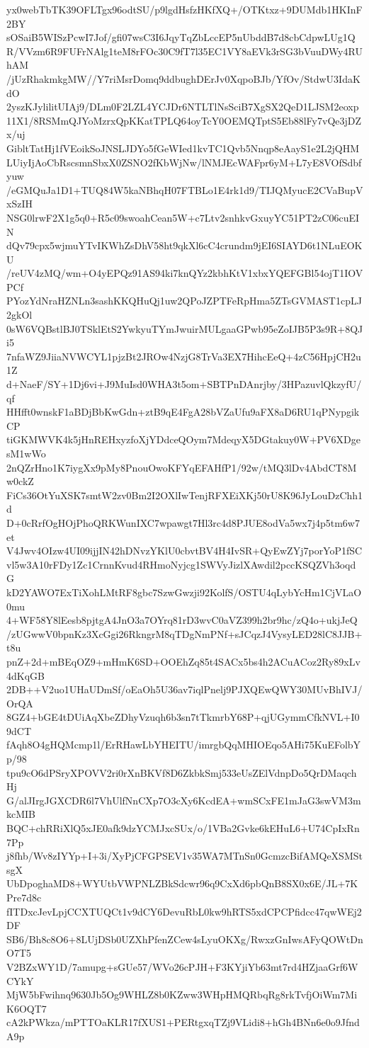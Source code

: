 yx0webTbTK39OFLTgx96odtSU/p9lgdHsfzHKfXQ+/OTKtxz+9DUMdb1HKInF2BY
sOSaiB5WISzPcwI7Jof/gfi07wsC3I6JqyTqZbLccEP5nUbddB7d8cbCdpwLUg1Q
R/VVzm6R9FUFrNAlg1teM8rFOc30C9fT7l35EC1VY8aEVk3rSG3bVuuDWy4RUhAM
/jUzRhakmkgMW//Y7riMsrDomq9ddbughDErJv0XqpoBJb/YfOv/StdwU3IdaKdO
2yszKJylilitUIAj9/DLm0F2LZL4YCJDr6NTLTlNsSciB7XgSX2QeD1LJSM2eoxp
11X1/8RSMmQJYoMzrxQpKKatTPLQ64oyTcY0OEMQTptS5Eb88lFy7vQe3jDZx/uj
GibltTatHj1fVEoikSoJNSLJDYo5fGeWIed1kvTC1Qvb5Nnqp8eAayS1e2L2jQHM
LUiyIjAoCbRscsmnSbxX0ZSNO2fKbWjNw/lNMJEcWAFpr6yM+L7yE8VOfSdbfyuw
/eGMQuJa1D1+TUQ84W5kaNBhqH07FTBLo1E4rk1d9/TIJQMyucE2CVaBupVxSzIH
NSG0lrwF2X1g5q0+R5c09swoahCean5W+c7Ltv2snhkvGxuyYC51PT2zC06cuEIN
dQv79cpx5wjmuYTvIKWhZsDhV58ht9qkXl6cC4crundm9jEI6SIAYD6t1NLuEOKU
/reUV4zMQ/wm+O4yEPQz91AS94ki7knQYz2kbhKtV1xbxYQEFGBl54ojT1IOVPCf
PYozYdNraHZNLn3sashKKQHuQj1uw2QPoJZPTFeRpHma5ZTsGVMAST1cpLJ2gkOl
0sW6VQBstlBJ0TSklEtS2YwkyuTYmJwuirMULgaaGPwb95eZoIJB5P3s9R+8QJi5
7nfaWZ9JiiaNVWCYL1pjzBt2JROw4NzjG8TrVa3EX7HihcEeQ+4zC56HpjCH2u1Z
d+NaeF/SY+1Dj6vi+J9MuIsd0WHA3t5om+SBTPnDAnrjby/3HPazuvlQkzyfU/qf
HHfft0wnskF1aBDjBbKwGdn+ztB9qE4FgA28bVZaUfu9aFX8aD6RU1qPNypgikCP
tiGKMWVK4k5jHnREHxyzfoXjYDdceQOym7MdeqyX5DGtakuy0W+PV6XDgesM1wWo
2nQZrHno1K7iygXx9pMy8PnouOwoKFYqEFAHfP1/92w/tMQ3lDv4AbdCT8Mw0ckZ
FiCs36OtYuXSK7smtW2zv0Bm2I2OXlIwTenjRFXEiXKj50rU8K96JyLouDzChh1d
D+0cRrfOgHOjPhoQRKWunIXC7wpawgt7Hl3rc4d8PJUE8odVa5wx7j4p5tm6w7et
V4Jwv4OIzw4UI09ijjIN42hDNvzYKlU0cbvtBV4H4IvSR+QyEwZYj7porYoP1fSC
vl5w3A10rFDy1Zc1CrnnKvud4RHmoNyjcg1SWVyJizlXAwdil2pccKSQZVh3oqdG
kD2YAWO7ExTiXohLMtRF8gbc7SzwGwzji92KolfS/OSTU4qLybYcHm1CjVLaO0mu
4+WF58Y8lEesb8pjtgA4JnO3a7OYrq81rD3wvC0aVZ399h2br9hc/zQ4o+ukjJeQ
/zUGwwV0bpnKz3XcGgi26RkngrM8qTDgNmPNf+sJCqzJ4VysyLED28lC8JJB+t8u
pnZ+2d+mBEqOZ9+mHmK6SD+OOEhZq85t4SACx5bs4h2ACuACoz2Ry89xLv4dKqGB
2DB++V2uo1UHaUDmSf/oEaOh5U36av7iqlPnelj9PJXQEwQWY30MUvBhIVJ/OrQA
8GZ4+bGE4tDUiAqXbeZDhyVzuqh6b3sn7tTkmrbY68P+qjUGymmCfkNVL+I09dCT
fAqh8O4gHQMcmp1l/ErRHawLbYHEITU/imrgbQqMHIOEqo5AHi75KuEFolbYp/98
tpu9cO6dPSryXPOVV2ri0rXnBKVf8D6ZkbkSmj533eUsZElVdnpDo5QrDMaqchHj
G/alJIrgJGXCDR6l7VhUlfNnCXp7O3cXy6KcdEA+wmSCxFE1mJaG3swVM3mkcMIB
BQC+chRRiXlQ5xJE0afk9dzYCMJxcSUx/o/1VBa2Gvke6kEHuL6+U74CpIxRn7Pp
j8fhb/Wv8zIYYp+I+3i/XyPjCFGPSEV1v35WA7MTnSn0GcmzcBifAMQeXSMStsgX
UbDpoghaMD8+WYUtbVWPNLZBkSdcwr96q9CxXd6pbQnB8SX0x6E/JL+7KPre7d8c
fITDxcJevLpjCCXTUQCt1v9dCY6DevuRbL0kw9hRTS5xdCPCPfidcc47qwWEj2DF
SB6/Bh8c8O6+8LUjDSb0UZXhPfenZCew4sLyuOKXg/RwxzGnIwsAFyQOWtDnO7T5
V2BZxWY1D/7amupg+sGUe57/WVo26cPJH+F3KYjiYb63mt7rd4HZjaaGrf6WCYkY
MjW5bFwihnq9630Jb5Og9WHLZ8b0KZww3WHpHMQRbqRg8rkTvfjOiWm7MiK6OQT7
cA2kPWkza/mPTTOaKLR17fXUS1+PERtgxqTZj9VLidi8+hGh4BNn6e0o9JfndA9p
